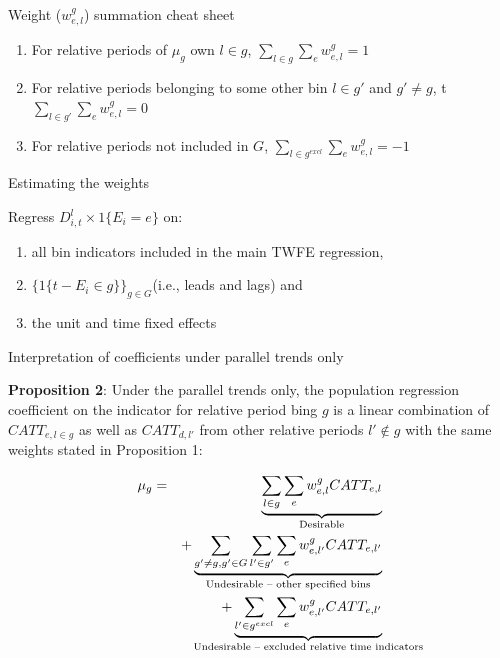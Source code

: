\documentclass{beamer}
\begin{document}
\begin{frame}{Weight ($w^g_{e,l}$) summation cheat sheet}

\begin{enumerate}
\item For relative periods of $\mu_g$ own $l \in g$, $\sum_{l \in g}\sum_ew^g_{e,l}=1$
\item For relative periods belonging to some other bin $l\in g'$ and $g' \neq g$, t $\sum_{l \in g'}\sum_ew^g_{e,l} = 0$
\item For relative periods not included in $G$, $\sum_{l \in g^{excl}} \sum_e w^g_{e,l} = -1$
\end{enumerate}

\end{frame}




\begin{frame}{Estimating the weights}

Regress $D^l_{i,t} \times 1\{E_i=e \}$ on:

\begin{enumerate}
\item all bin indicators included in the main TWFE regression, 
\item $\{ 1\{ t-E_i \in g \} \}_{g \in G}$(i.e., leads and lags) and 
\item the unit and time fixed effects
\end{enumerate}

\end{frame}


\begin{frame}{Interpretation of coefficients under parallel trends only}

\textbf{Proposition 2}: Under the parallel trends only, the population regression coefficient on the indicator for relative period bing $g$ is a linear combination of $CATT_{e,l \in g}$ as well as $CATT_{d,l'}$ from other relative periods $l' \notin g$ with the same weights stated in Proposition 1:

\begin{eqnarray*}
\mu_g &=& \underbrace{\sum_{l \in g} \sum_e w^g_{e,l} CATT_{e,l}}_{\mathclap{\text{Desirable}}} \\
&& + \underbrace{\sum_{g' \neq g, g' \in G} \sum_{l' \in g'} \sum_e w^g_{e,l'}  CATT_{e,l'}}_{\mathclap{\text{Undesirable -- other specified bins}}} \\
&&+ \underbrace{\sum_{l' \in g^{excl}} \sum_e w^g_{e,l'} CATT_{e,l'}}_{\mathclap{\text{Undesirable -- excluded relative time indicators}}}
\end{eqnarray*}



\end{frame}
\end{document}
